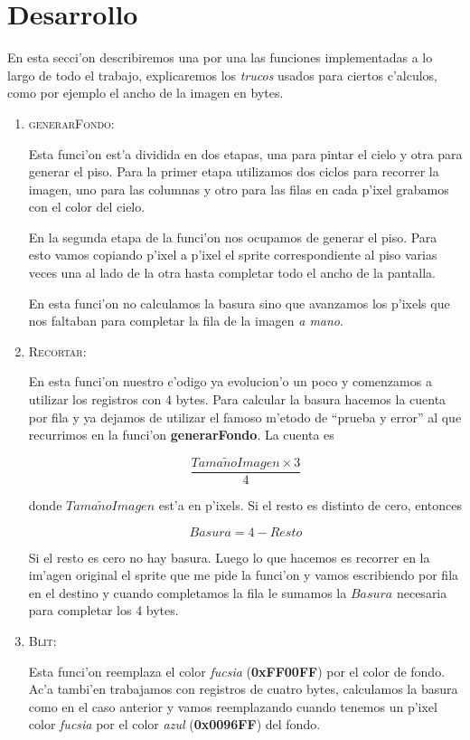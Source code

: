 \section{Desarrollo}
En esta secci'on describiremos una por una las funciones implementadas a lo largo de todo el trabajo, explicaremos los \textit{trucos} usados para ciertos c'alculos, como por ejemplo el ancho de la imagen en bytes.

\begin{enumerate}
 \item \textsc{generarFondo}:

Esta funci'on est'a dividida en dos etapas, una para pintar el cielo y otra
para generar el piso. Para la primer etapa utilizamos dos ciclos para recorrer
la imagen, uno para las columnas y otro para las filas en cada p'ixel grabamos
con el color del cielo.

En la segunda etapa de la funci'on nos ocupamos de generar el piso.  Para esto
vamos copiando p'ixel a p'ixel el sprite correspondiente al piso varias veces
una al lado de la otra hasta completar todo el ancho de la pantalla. 

En esta funci'on no calculamos la basura sino que avanzamos los p'ixels que nos
faltaban para completar la fila de la imagen \textit{a mano}.

\item \textsc{Recortar}:

En esta funci'on nuestro c'odigo ya evolucion'o un poco y comenzamos a utilizar
los registros con 4 bytes.  Para calcular la basura hacemos la cuenta por fila
y ya dejamos de utilizar el famoso m'etodo de ``prueba y error'' al que
recurrimos en la funci'on \textbf{generarFondo}.  La cuenta es 

$$
\frac{Tama\tilde{n}oImagen \times 3}{4}
$$

donde $Tama\tilde{n}oImagen$ est'a en p'ixels.  Si el resto es distinto de cero, entonces 

$$
Basura = 4 - Resto
$$

Si el resto es cero no hay basura. Luego lo que hacemos es recorrer en la
im'agen original el sprite que me pide la funci'on y vamos escribiendo por fila
en el destino y cuando completamos la fila le sumamos la $Basura$ necesaria
para completar los 4 bytes.

\item \textsc{Blit}:

Esta funci'on reemplaza el color \textit{fucsia} (\textbf{0xFF00FF}) por el
color de fondo.  Ac'a tambi'en trabajamos con registros de cuatro bytes,
calculamos la basura como en el caso anterior y vamos reemplazando cuando
tenemos un p'ixel color \textit{fucsia} por el color \textit{azul}
(\textbf{0x0096FF}) del fondo.  


\end{enumerate}

